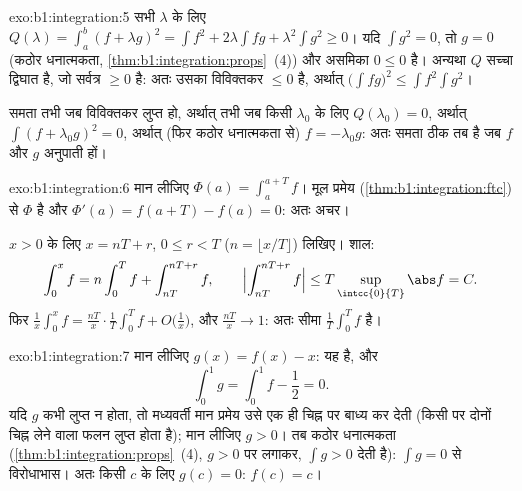 \begin{solution}{exo:b1:integration:5}
सभी $\lambda$ के लिए $Q(\lambda) = \int_a^b (f + \lambda g)^2 = \int f^2 +
2\lambda \int fg + \lambda^2 \int g^2 \geq 0$। यदि $\int g^2 = 0$, तो $g =
0$ (कठोर धनात्मकता, \cref{thm:b1:integration:props}~(4)) और असमिका $0 \leq
0$ है। अन्यथा $Q$ सच्चा द्विघात है, जो सर्वत्र $\geq 0$ है: अतः उसका
विविक्तकर $\leq 0$ है, अर्थात् $\bigl(\int fg\bigr)^2 \leq \int f^2 \int
g^2$।

समता तभी जब विविक्तकर लुप्त हो, अर्थात् तभी जब किसी $\lambda_0$ के लिए
$Q(\lambda_0) = 0$, अर्थात् $\int (f + \lambda_0 g)^2 = 0$, अर्थात् (फिर
कठोर धनात्मकता से) $f = -\lambda_0 g$: अतः समता ठीक तब है जब $f$ और $g$
अनुपाती हों।
\end{solution}

\begin{solution}{exo:b1:integration:6}
मान लीजिए $\Phi(a) = \int_a^{a+T} f$। मूल प्रमेय
(\cref{thm:b1:integration:ftc}) से $\Phi$  है और $\Phi'(a) = f(a + T)
- f(a) = 0$: अतः अचर।

$x > 0$ के लिए $x = nT + r$, $0 \leq r < T$ ($n = \lfloor x/T \rfloor$)
लिखिए। शाल:
\[
\int_0^x f = n \int_0^T f + \int_{nT}^{nT + r} f,
\qquad
\Bigl| \int_{nT}^{nT+r} f \Bigr| \leq T \sup_{\intcc{0}{T}} \abs f
= C .
\]
फिर $\frac 1x \int_0^x f = \frac{nT}{x}\cdot\frac 1T \int_0^T f +
O\bigl(\frac 1x\bigr)$, और $\frac{nT}{x} \to 1$: अतः सीमा $\frac1T \int_0^T
f$ है।
\end{solution}

\begin{solution}{exo:b1:integration:7}
मान लीजिए $g(x) = f(x) - x$: यह  है, और
\[
\int_0^1 g = \int_0^1 f - \frac12 = 0 .
\]
यदि $g$ कभी लुप्त न होता, तो मध्यवर्ती मान प्रमेय उसे एक ही चिह्न पर बाध्य
कर देती (किसी  पर दोनों चिह्न लेने वाला  फलन लुप्त होता है); मान
लीजिए $g > 0$। तब कठोर धनात्मकता (\cref{thm:b1:integration:props}~(4), $g >
0$ पर लगाकर, $\int g > 0$ देती है): $\int g = 0$ से विरोधाभास। अतः किसी $c$
के लिए $g(c) = 0$: $f(c) = c$।
\end{solution}

